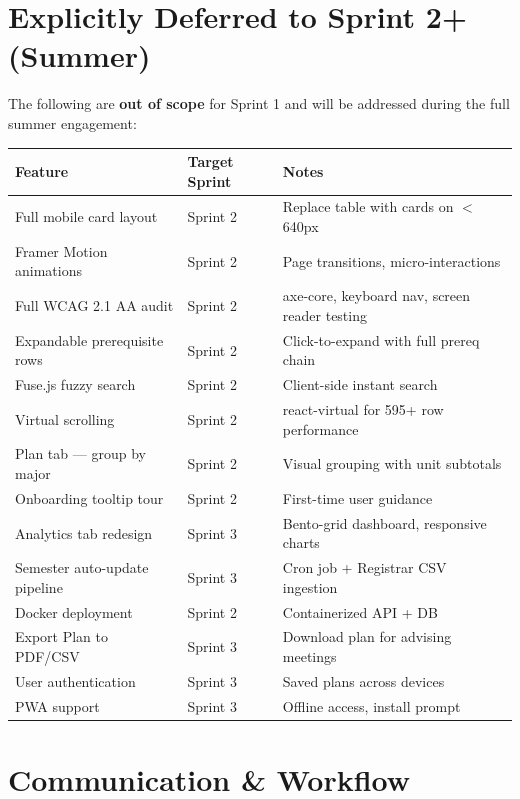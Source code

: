 \documentclass[11pt]{article}
\begin{document}
\section{Explicitly Deferred to Sprint 2+ (Summer)}

The following are \textbf{out of scope} for Sprint 1 and will be addressed during the full summer engagement:

\begin{longtable}{p{} p{} p{}}
\toprule
\textbf{Feature} & \textbf{Target Sprint} & \textbf{Notes} \\
\midrule
Full mobile card layout & Sprint 2 & Replace table with cards on $<$640px \\
Framer Motion animations & Sprint 2 & Page transitions, micro-interactions \\
Full WCAG 2.1 AA audit & Sprint 2 & axe-core, keyboard nav, screen reader testing \\
Expandable prerequisite rows & Sprint 2 & Click-to-expand with full prereq chain \\
Fuse.js fuzzy search & Sprint 2 & Client-side instant search \\
Virtual scrolling & Sprint 2 & react-virtual for 595+ row performance \\
Plan tab — group by major & Sprint 2 & Visual grouping with unit subtotals \\
Onboarding tooltip tour & Sprint 2 & First-time user guidance \\
Analytics tab redesign & Sprint 3 & Bento-grid dashboard, responsive charts \\
Semester auto-update pipeline & Sprint 3 & Cron job + Registrar CSV ingestion \\
Docker deployment & Sprint 2 & Containerized API + DB \\
Export Plan to PDF/CSV & Sprint 3 & Download plan for advising meetings \\
User authentication & Sprint 3 & Saved plans across devices \\
PWA support & Sprint 3 & Offline access, install prompt \\
\bottomrule
\end{longtable}

\section{Communication \& Workflow}
\end{document}
